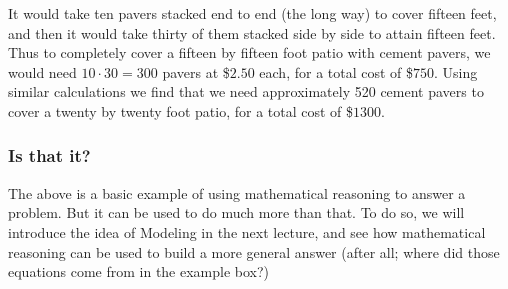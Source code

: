 It would take ten pavers stacked end to end (the long way) to cover fifteen feet, and then it would take thirty of them stacked side by side to attain fifteen feet. Thus to completely cover a fifteen by fifteen foot patio with cement pavers, we would need $10 \cdot 30 = 300$ pavers at \$$2.50$ each, for a total cost of \$$750$. Using similar calculations we find that we need approximately 520 cement pavers to cover a twenty by twenty foot patio, for a total cost of \$$1300$.

\subsubsection*{Is that it?}

The above is a basic example of using mathematical reasoning to answer a problem. But it can be used to do much more than that. To do so, we will introduce the idea of Modeling in the next lecture, and see how mathematical reasoning can be used to build a more general answer (after all; where did those equations come from in the example box?) 



